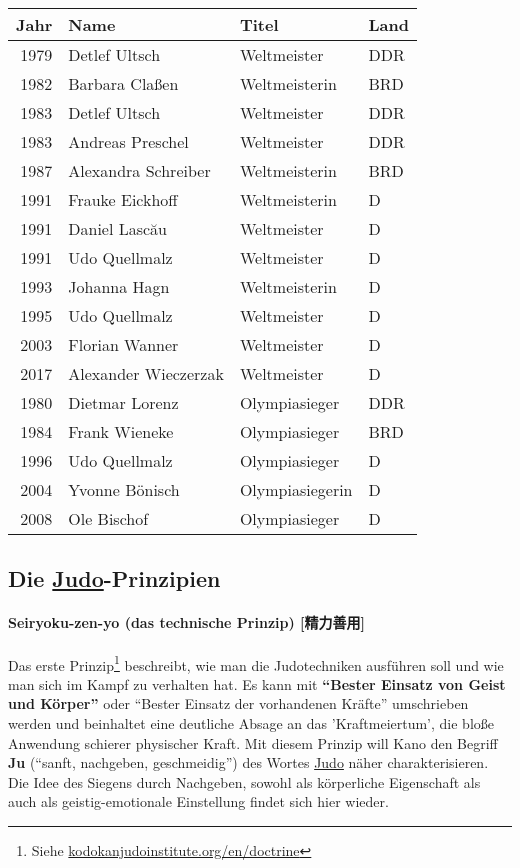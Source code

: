 \documentclass[justified, a4paper, notitlepage, captions=tableheading, nobib]{tufte-handout}
\begin{document}
\begin{center}
\begin{tabular}{rlll}
\hline
Jahr & Name & Titel & Land\\
\hline
1979 & Detlef Ultsch & Weltmeister & DDR\\
1982 & Barbara Claßen & Weltmeisterin & BRD\\
1983 & Detlef Ultsch & Weltmeister & DDR\\
1983 & Andreas Preschel & Weltmeister & DDR\\
1987 & Alexandra Schreiber & Weltmeisterin & BRD\\
1991 & Frauke Eickhoff & Weltmeisterin & D\\
1991 & Daniel Lascău & Weltmeister & D\\
1991 & Udo Quellmalz & Weltmeister & D\\
1993 & Johanna Hagn & Weltmeisterin & D\\
1995 & Udo Quellmalz & Weltmeister & D\\
2003 & Florian Wanner & Weltmeister & D\\
2017 & Alexander Wieczerzak & Weltmeister & D\\
\hline
1980 & Dietmar Lorenz & Olympiasieger & DDR\\
1984 & Frank Wieneke & Olympiasieger & BRD\\
1996 & Udo Quellmalz & Olympiasieger & D\\
2004 & Yvonne Bönisch & Olympiasiegerin & D\\
2008 & Ole Bischof & Olympiasieger & D\\
\hline
\end{tabular}
\end{center}

\subsection{Die \hyperref[org39a3ee2]{Judo}-Prinzipien}
\label{sec:org91a5cba}
\paragraph{\label{org558279f}Seiryoku-zen-yo (das technische Prinzip) [精力善用]}
\label{sec:org9d34e7f}
Das erste Prinzip\footnote{Siehe \href{http://kodokanjudoinstitute.org/en/doctrine}{kodokanjudoinstitute.org/en/doctrine}} beschreibt, wie man die Judotechniken ausführen soll und wie man sich im Kampf zu verhalten hat. Es kann mit \textbf{"`Bester Einsatz von Geist und Körper"'} oder "`Bester Einsatz der vorhandenen Kräfte"' umschrieben werden und beinhaltet eine deutliche Absage an das 'Kraftmeiertum', die bloße Anwendung schierer physischer Kraft. Mit diesem Prinzip will Kano den Begriff \textbf{Ju} ("`sanft, nachgeben, geschmeidig"') des Wortes \hyperref[org39a3ee2]{Judo} näher charakterisieren. Die Idee des Siegens durch Nachgeben, sowohl als körperliche Eigenschaft als auch als geistig-emotionale Einstellung findet sich hier wieder.
\end{document}
